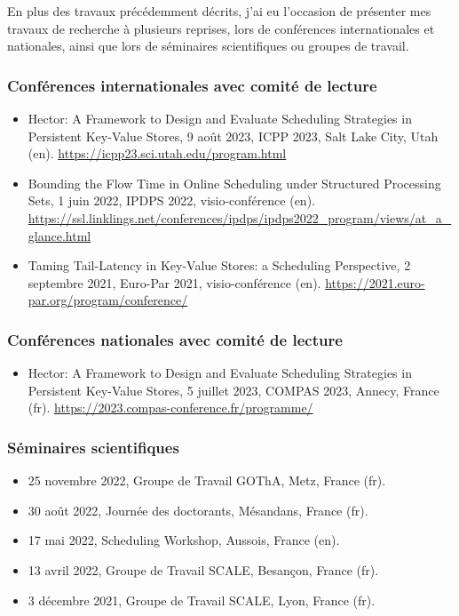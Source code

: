 \documentclass[12pt]{article}
\begin{document}
En plus des travaux précédemment décrits, j'ai eu l'occasion de présenter mes travaux de recherche à
plusieurs reprises, lors de conférences internationales et nationales, ainsi que lors de séminaires
scientifiques ou groupes de travail.

\subsubsection*{Conférences internationales avec comité de lecture}

\begin{itemize}
    \item \foreignlanguage{english}{Hector: A Framework to Design and Evaluate Scheduling Strategies
    in Persistent Key-Value Stores}, 9 août 2023, ICPP 2023, Salt Lake City, Utah (en).
    \url{https://icpp23.sci.utah.edu/program.html}
    \item \foreignlanguage{english}{Bounding the Flow Time in Online Scheduling under Structured
    Processing Sets}, 1 juin 2022, IPDPS 2022, visio-conférence (en).
    \url{https://ssl.linklings.net/conferences/ipdps/ipdps2022_program/views/at_a_glance.html}
    \item \foreignlanguage{english}{Taming Tail-Latency in Key-Value Stores: a Scheduling
    Perspective}, 2 septembre 2021, Euro-Par 2021, visio-conférence (en).
    \url{https://2021.euro-par.org/program/conference/}
\end{itemize}

\subsubsection*{Conférences nationales avec comité de lecture}

\begin{itemize}
  \item \foreignlanguage{english}{Hector: A Framework to Design and Evaluate Scheduling Strategies
  in Persistent Key-Value Stores}, 5 juillet 2023, COMPAS 2023, Annecy, France (fr).
  \url{https://2023.compas-conference.fr/programme/}
\end{itemize}

\subsubsection*{Séminaires scientifiques}

\begin{itemize}
  \item 25 novembre 2022, Groupe de Travail GOThA, Metz, France (fr).
  \item 30 août 2022, Journée des doctorants, Mésandans, France (fr).
  \item 17 mai 2022, Scheduling Workshop, Aussois, France (en).
  \item 13 avril 2022, Groupe de Travail SCALE, Besançon, France (fr).
  \item 3 décembre 2021, Groupe de Travail SCALE, Lyon, France (fr).
\end{itemize}
\end{document}
